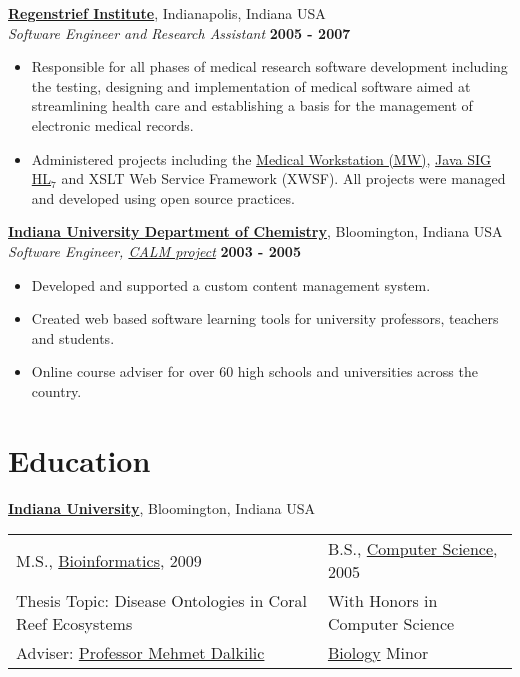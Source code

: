 \documentclass{res}
\begin{document}
\begin{resume}
\href{http://www.regenstrief.org/}{\textbf{Regenstrief Institute}},
Indianapolis, Indiana USA\\
\textit{Software Engineer and Research Assistant} \hfill \textbf{2005 - 2007}
\begin{itemize} \itemsep -2pt
\item Responsible for all phases of medical research software development including the testing, designing and implementation of medical software aimed at streamlining health care and establishing a basis for the management of electronic medical records.
\item Administered projects including the \href{http://aurora.regenstrief.org/mw}{Medical Workstation (MW)}, \href{http://aurora.regenstrief.org/javasig}{Java SIG HL$_{7}$} and XSLT Web Service Framework (XWSF).  All projects were managed and developed using open source practices.  
\end{itemize}

\href{http://chem.indiana.edu/}{\textbf{Indiana University Department of Chemistry}}, Bloomington, Indiana USA\\
\textit{Software Engineer, \href{http://calm.indiana.edu/}{CALM project}} \hfill \textbf{2003 - 2005}
\begin{itemize} \itemsep -2pt
\item Developed and supported a custom content management system.
\item Created web based software learning tools for university professors, teachers and students.
\item Online course adviser for over 60 high schools and universities across the country.
\end{itemize}

\section{Education}
\href{http://www.iub.edu/}{\textbf{Indiana University}}, Bloomington, Indiana USA\\
\begin{tabular}{ p{10cm} l } 
M.S., \href{http://xavier.informatics.indiana.edu/gradsites/bio/masters/}{Bioinformatics}, 2009 & B.S., \href{http://www.cs.indiana.edu/}{Computer Science}, 2005\\
Thesis Topic: Disease Ontologies in Coral Reef Ecosystems & With Honors in Computer Science\\
Adviser: \href{http://www.informatics.indiana.edu/dalkilic/}{Professor Mehmet Dalkilic} & \href{http://www.bio.indiana.edu/}{Biology} Minor
\end{tabular}


\end{resume}
\end{document}
